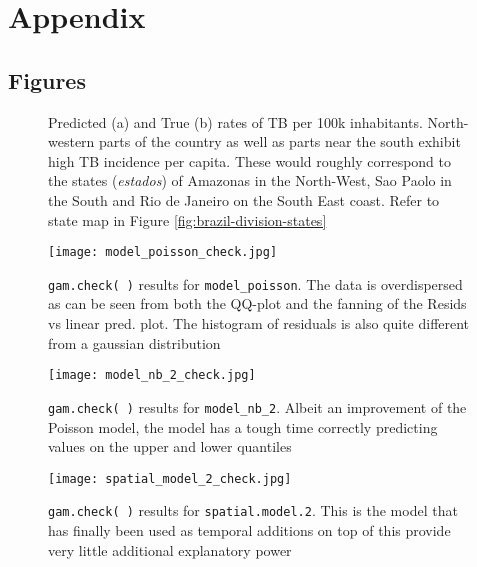
\section{Appendix}

\subsection{Figures}

\begin{figure}[H]
	\centering
	\qquad
	\caption{Predicted (a) and True (b) rates of TB per 100k inhabitants. North-western parts of the country as well as parts near the south exhibit high TB incidence per capita. These would roughly correspond to the states (\textit{estados}) of Amazonas in the North-West, Sao Paolo in the South and Rio de Janeiro on the South East coast. Refer to state map in Figure \ref{fig:brazil-division-states}}%
	\label{fig:pred_TB_rate_map}%
\end{figure}

\begin{figure}[H]
\centering
\texttt{[image: model\_poisson\_check.jpg]}
\caption{\label{fig:model_poisson_check}\texttt{gam.check( )} results for \texttt{model\_poisson}. The data is overdispersed as can be seen from both the QQ-plot and the fanning of the Resids vs linear pred. plot. The histogram of residuals is also quite different from a gaussian distribution}
\end{figure}

\begin{figure}[H]
\centering
\texttt{[image: model\_nb\_2\_check.jpg]}
\caption{\label{fig:model_nb_2_check}\texttt{gam.check( )} results for \texttt{model\_nb\_2}. Albeit an improvement of the Poisson model, the model has a tough time correctly predicting values on the upper and lower quantiles}
\end{figure}

\begin{figure}[H]
\centering
\texttt{[image: spatial\_model\_2\_check.jpg]}
\caption{\label{fig:spatial_model_2_check}\texttt{gam.check( )} results for \texttt{spatial.model.2}. This is the model that has finally been used as temporal additions on top of this provide very little additional explanatory power}
\end{figure}


